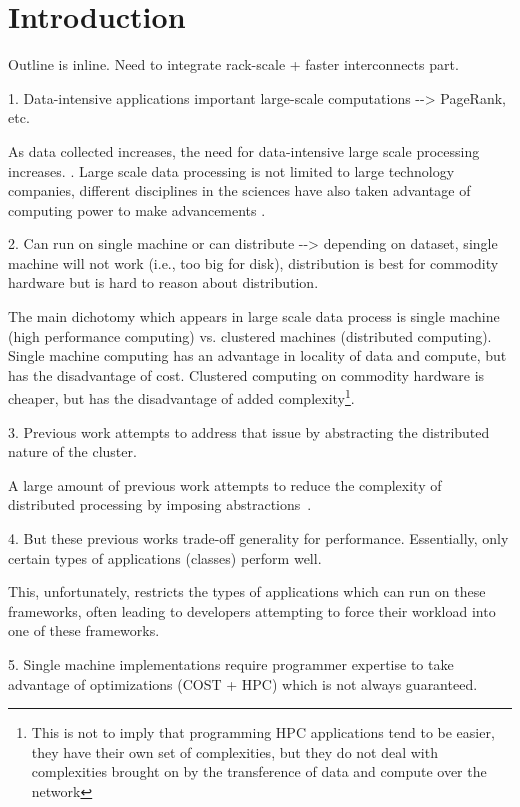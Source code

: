 \section{Introduction} 
\label{sec:intro}

\ac{Outline is inline. Need to integrate rack-scale + faster interconnects
part.}

\ac{1. Data-intensive applications important large-scale computations -->
PageRank, etc.}

As data collected increases, the need for data-intensive large scale processing
increases. . Large scale
data processing is not limited to large technology companies, different
disciplines in the sciences have also taken advantage of computing power to make
advancements . 

\ac{2. Can run on single machine or can distribute --> depending on dataset,
	single machine will not work (i.e., too big for disk), distribution is best for
	commodity hardware but is hard to reason about distribution.}

The main dichotomy
which appears in large scale data process is single machine (high performance
computing) vs. clustered machines (distributed computing). Single machine
computing has an advantage in locality of data and compute, but has the
disadvantage of cost. Clustered computing on commodity hardware is cheaper, but
has the disadvantage of added complexity\footnote{This is not to imply that
programming HPC applications tend to be easier, they have their own set of
complexities, but they do not deal with complexities brought on by the
transference of data and compute over the network}. 

\ac{3. Previous work attempts to address that issue by abstracting the
	distributed nature of the cluster.}

A large amount of previous work attempts to reduce the complexity of
distributed processing by imposing abstractions~\cite{Dean2004,Low2010,Murray2013}.

\ac{4. But these previous works trade-off generality for performance.
	Essentially, only certain types of applications (classes) perform well. }

This, unfortunately, restricts the types of applications which can run on these
frameworks, often leading to developers attempting to force their workload into
one of these frameworks. 

\ac{5. Single machine implementations require programmer expertise to take
	advantage of optimizations (COST + HPC) which is not always guaranteed.}


